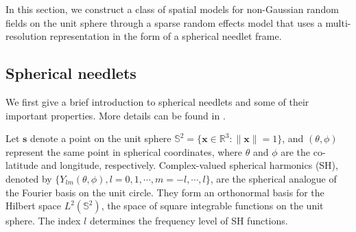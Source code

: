 \documentclass[aoas,preprint]{imsart}
\numberwithin{equation}{section}
\theoremstyle{plain}
\begin{document}
In this section, we construct a class of spatial models for non-Gaussian random fields on the unit sphere through a sparse random effects model that uses 
a multi-resolution representation in the form of a spherical needlet frame.
  
\subsection{Spherical needlets}
We first give a brief introduction to spherical needlets and some of their important properties. More details can be found in \citet{Narcowich-etal06, Marinucci2011, Fan-15}. 

Let $\mathbf{s}$ denote a point on the unit sphere $\mathbb{S}^2=\{\mathbf{x}\in \mathbb{R}^3: \lVert \mathbf{x} \rVert=1 \}$, and $(\theta, \phi)$ represent the same point in spherical coordinates, where $\theta$ and $\phi$ are the co-latitude and longitude, respectively. Complex-valued spherical harmonics (SH), denoted by $\{ Y_{lm}(\theta, \phi), l=0,1,\cdots,m=-l,\cdots, l\}$, are 
the spherical analogue of the Fourier basis on the unit circle. They form an orthonormal basis for the Hilbert space $L^2(\mathbb{S}^2)$, the space of square integrable functions on the unit sphere. The index $l$ determines the frequency level of SH functions.
\end{document}
